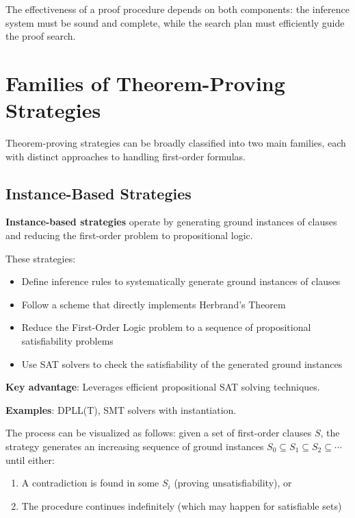 \documentclass[11pt,a4paper]{article}
\theoremstyle{definition}
\theoremstyle{plain}
\theoremstyle{remark}
\begin{document}
The effectiveness of a proof procedure depends on both components: the inference system must be sound and complete, while the search plan must efficiently guide the proof search.

\section{Families of Theorem-Proving Strategies}

Theorem-proving strategies can be broadly classified into two main families, each with distinct approaches to handling first-order formulas.

\subsection{Instance-Based Strategies}

\textbf{Instance-based strategies} operate by generating ground instances of clauses and reducing the first-order problem to propositional logic.

\begin{tcolorbox}[colback=green!5!white,colframe=green!75!black,title=\textbf{Instance-Based Approach}]
These strategies:
\begin{itemize}
    \item Define inference rules to systematically generate ground instances of clauses
    \item Follow a scheme that directly implements Herbrand's Theorem
    \item Reduce the First-Order Logic problem to a sequence of propositional satisfiability problems
    \item Use SAT solvers to check the satisfiability of the generated ground instances
\end{itemize}

\textbf{Key advantage}: Leverages efficient propositional SAT solving techniques.

\textbf{Examples}: DPLL(T), SMT solvers with instantiation.
\end{tcolorbox}

The process can be visualized as follows: given a set of first-order clauses $S$, the strategy generates an increasing sequence of ground instances $S_0 \subseteq S_1 \subseteq S_2 \subseteq \cdots$ until either:
\begin{enumerate}
    \item A contradiction is found in some $S_i$ (proving unsatisfiability), or
    \item The procedure continues indefinitely (which may happen for satisfiable sets)
\end{enumerate}
\end{document}
